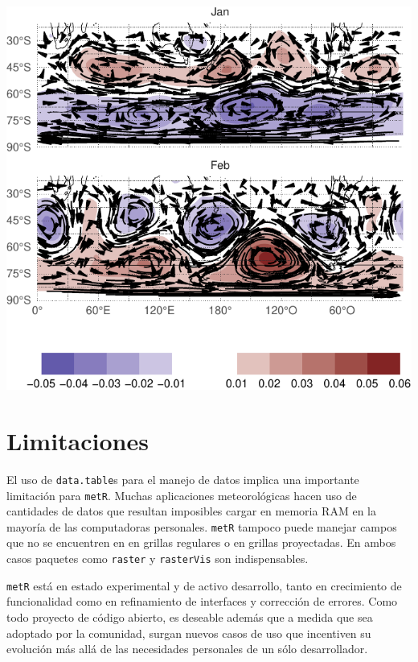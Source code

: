 \documentclass[runningheads]{llncs}
\begin{document}
\includegraphics{abstract_files/figure-latex/unnamed-chunk-3-1.pdf}

\section{Limitaciones}\label{limitaciones}

El uso de \texttt{data.table}s para el manejo de datos implica una
importante limitación para \texttt{metR}. Muchas aplicaciones
meteorológicas hacen uso de cantidades de datos que resultan imposibles
cargar en memoria RAM en la mayoría de las computadoras personales.
\texttt{metR} tampoco puede manejar campos que no se encuentren en en
grillas regulares o en grillas proyectadas. En ambos casos paquetes como
\texttt{raster} y \texttt{rasterVis} son indispensables.

\texttt{metR} está en estado experimental y de activo desarrollo, tanto
en crecimiento de funcionalidad como en refinamiento de interfaces y
corrección de errores. Como todo proyecto de código abierto, es deseable
además que a medida que sea adoptado por la comunidad, surgan nuevos
casos de uso que incentiven su evolución más allá de las necesidades
personales de un sólo desarrollador.
\end{document}
